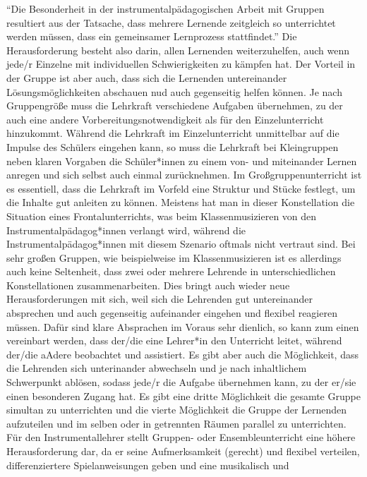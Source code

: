 \enquote{Die Besonderheit in der instrumentalpädagogischen Arbeit mit Gruppen resultiert
aus der Tatsache, dass mehrere Lernende zeitgleich so unterrichtet werden
müssen, dass ein gemeinsamer Lernprozess stattfindet.}
\autocite[221]{busch:grundwissen_instrumentalpaedagogik} Die Herausforderung
besteht also darin, allen Lernenden weiterzuhelfen, auch wenn jede/r Einzelne
mit individuellen Schwierigkeiten zu kämpfen hat. Der Vorteil in der Gruppe ist
aber auch, dass sich die Lernenden untereinander Lösungsmöglichkeiten abschauen
nud auch gegenseitig helfen können. Je nach Gruppengröße muss die Lehrkraft
verschiedene Aufgaben übernehmen, zu der auch eine andere
Vorbereitungsnotwendigkeit als für den Einzelunterricht hinzukommt. Während die
Lehrkraft im Einzelunterricht unmittelbar auf die Impulse des Schülers eingehen
kann, so muss die Lehrkraft bei Kleingruppen neben klaren Vorgaben die Schüler*innen zu
einem von- und miteinander Lernen anregen und sich selbst auch einmal
zurücknehmen. Im Großgruppenunterricht ist es essentiell, dass die Lehrkraft im
Vorfeld eine Struktur und Stücke festlegt, um die Inhalte gut anleiten zu
können.\autocite[220]{busch:grundwissen_instrumentalpaedagogik} Meistens hat man
in dieser Konstellation die Situation eines Frontalunterrichts, was beim
Klassenmusizieren von den Instrumentalpädagog*innen verlangt wird, während die
Instrumentalpädagog*innen mit diesem Szenario oftmals nicht vertraut sind. Bei sehr
großen Gruppen, wie beispielweise im Klassenmusizieren ist es allerdings auch
keine Seltenheit, dass zwei oder mehrere Lehrende in unterschiedlichen
Konstellationen zusammenarbeiten. Dies bringt auch wieder neue Herausforderungen
mit sich, weil sich die Lehrenden gut untereinander absprechen und auch
gegenseitig aufeinander eingehen und flexibel reagieren müssen. Dafür sind klare
Absprachen im Voraus sehr dienlich, so kann zum einen vereinbart werden, dass
der/die eine Lehrer*in den Unterricht leitet, während der/die aAdere beobachtet und
assistiert. Es gibt aber auch die Möglichkeit, dass die Lehrenden sich
unterinander abwechseln und je nach inhaltlichem Schwerpunkt ablösen, sodass
jede/r die Aufgabe übernehmen kann, zu der er/sie einen besonderen Zugang hat. Es gibt
eine dritte Möglichkeit die gesamte Gruppe simultan zu unterrichten und die
vierte Möglichkeit die Gruppe der Lernenden aufzuteilen und im selben oder in
getrennten Räumen parallel zu unterrichten. 
Für den Instrumentallehrer stellt Gruppen- oder Ensembleunterricht eine höhere
Herausforderung dar, da er seine Aufmerksamkeit (gerecht) und flexibel
verteilen, differenziertere Spielanweisungen geben und eine musikalisch und
